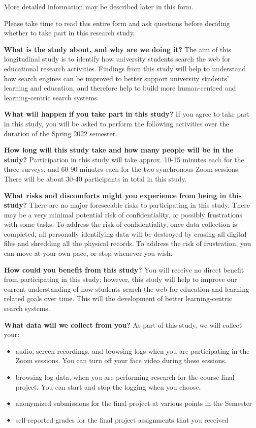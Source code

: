 \documentclass[letterpaper, nobind]{templates/ociamthesis}
\providecommand{\tightlist}{%
  \setlength{\itemsep}{0pt}\setlength{\parskip}{0pt}}
\begin{document}
More detailed information may be described later in this form.

Please take time to read this entire form and ask questions before deciding whether to take part in this research study.

\textbf{What is the study about, and why are we doing it?}
The aim of this longitudinal study is to identify how university students search the web for educational research activities. Findings from this study will help to understand how search engines can be improved to better support university students' learning and education, and therefore help to build more human-centred and learning-centric search systems.

\textbf{What will happen if you take part in this study?}
If you agree to take part in this study, you will be asked to perform the following activities over the duration of the Spring 2022 semester.

\textbf{How long will this study take and how many people will be in the study?}
Participation in this study will take approx. 10-15 minutes each for the three surveys, and 60-90 minutes each for the two synchronous Zoom sessions. There will be about 30-40 participants in total in this study.

\textbf{What risks and discomforts might you experience from being in this study?}
There are no major foreseeable risks to participating in this study. There may be a very minimal potential risk of confidentiality, or possibly frustrations with some tasks. To address the risk of confidentiality, once data collection is completed, all personally identifying data will be destroyed by erasing all digital files and shredding all the physical records. To address the risk of frustration, you can move at your own pace, or stop whenever you wish.

\textbf{How could you benefit from this study?}
You will receive no direct benefit from participating in this study; however, this study will help to improve our current understanding of how students search the web for education and learning-related goals over time. This will the development of better learning-centric search systems.

\textbf{What data will we collect from you?}
As part of this study, we will collect your:

\begin{itemize}
\tightlist
\item
  audio, screen recordings, and browsing logs when you are participating in the Zoom sessions. You can turn off your face video during these sessions.
\item
  browsing log data, when you are performing research for the course final project. You can start and stop the logging when you choose.
\item
  anonymized submissions for the final project at various points in the Semester
\item
  self-reported grades for the final project assignments that you received
\end{itemize}
\end{document}
